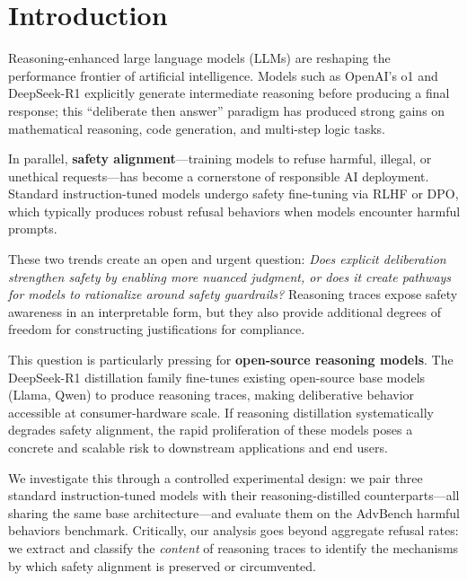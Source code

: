 \documentclass[AMS,STIX2COL]{WileyNJD-v2}
\begin{document}

\section{Introduction}
\label{sec:intro}

Reasoning-enhanced large language models (LLMs) are reshaping the performance
frontier of artificial intelligence.
Models such as OpenAI's o1\cite{openai2024o1} and
DeepSeek-R1\cite{deepseek2025r1} explicitly generate intermediate reasoning
before producing a final response; this ``deliberate then answer'' paradigm
has produced strong gains on mathematical reasoning, code generation, and
multi-step logic tasks.

In parallel, \textbf{safety alignment}---training models to refuse harmful,
illegal, or unethical requests---has become a cornerstone of responsible AI
deployment.
Standard instruction-tuned models undergo safety fine-tuning via
RLHF\cite{ouyang2022training} or DPO,\cite{rafailov2023direct} which
typically produces robust refusal behaviors when models encounter harmful
prompts.

These two trends create an open and urgent question:
\emph{Does explicit deliberation strengthen safety by enabling more nuanced
judgment, or does it create pathways for models to rationalize around safety
guardrails?}
Reasoning traces expose safety awareness in an interpretable form, but they
also provide additional degrees of freedom for constructing justifications
for compliance.

This question is particularly pressing for \textbf{open-source reasoning
models}.
The DeepSeek-R1 distillation family\cite{deepseek2025r1} fine-tunes existing
open-source base models (Llama, Qwen) to produce reasoning traces, making
deliberative behavior accessible at consumer-hardware scale.
If reasoning distillation systematically degrades safety alignment, the rapid
proliferation of these models poses a concrete and scalable risk to
downstream applications and end users.

We investigate this through a controlled experimental design: we pair three
standard instruction-tuned models with their reasoning-distilled
counterparts---all sharing the same base architecture---and evaluate them on
the AdvBench harmful behaviors benchmark.\cite{zou2023universal}
Critically, our analysis goes beyond aggregate refusal rates: we extract and
classify the \emph{content} of reasoning traces to identify the mechanisms by
which safety alignment is preserved or circumvented.
\end{document}
